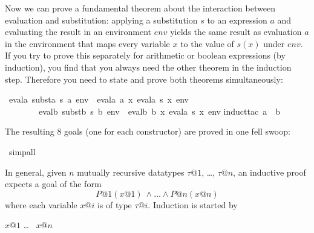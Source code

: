 \begin{isabellebody}
\begin{isamarkuptext}
Now we can prove a fundamental theorem about the interaction between
evaluation and substitution: applying a substitution $s$ to an expression $a$
and evaluating the result in an environment $env$ yields the same result as
evaluation $a$ in the environment that maps every variable $x$ to the value
of $s(x)$ under $env$. If you try to prove this separately for arithmetic or
boolean expressions (by induction), you find that you always need the other
theorem in the induction step. Therefore you need to state and prove both
theorems simultaneously:%
\end{isamarkuptext}%
\isamarkuptrue%
\isamarkupfalse%
\ {}evala\ {}substa\ s\ a{}\ env\ {}\ evala\ a\ {}{}x{}\ evala\ {}s\ x{}\ env{}\ {}\isanewline
\ \ \ \ \ \ \ \ evalb\ {}substb\ s\ b{}\ env\ {}\ evalb\ b\ {}{}x{}\ evala\ {}s\ x{}\ env{}{}\isanewline
%
\isadelimproof
%
\endisadelimproof
%
\isatagproof
{}\isamarkupfalse%
{}induct{}tac\ a\ \ b{}%
\begin{isamarkuptxt}%
\noindent The resulting 8 goals (one for each constructor) are proved in one fell swoop:%
\end{isamarkuptxt}%
\isamarkuptrue%
\isamarkupfalse%
\ simp{}all%
\endisatagproof
{\isafoldproof}%
%
\isadelimproof
%
\endisadelimproof
%
\begin{isamarkuptext}%
In general, given $n$ mutually recursive datatypes $\tau@1$, \dots, $\tau@n$,
an inductive proof expects a goal of the form
\[ P@1(x@1)\ \land \dots \land P@n(x@n) \]
where each variable $x@i$ is of type $\tau@i$. Induction is started by
\begin{isabelle}
 $x@1$  \dots\  $x@n$
\end{isabelle}


\end{isamarkuptext}
\end{isabellebody}
